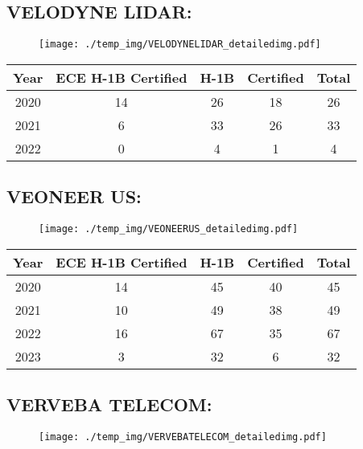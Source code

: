 \documentclass{article}%
\begin{document}
%
\newpage%
\subsection{VELODYNE LIDAR:}%
\label{subsec:VELODYNELIDAR}%
\label{VELODYNELIDARdetailed}%


\begin{figure}[htbp]%
\centering%
\texttt{[image: ./temp\_img/VELODYNELIDAR\_detailedimg.pdf]}%
\end{figure}

%
\begin{longtable}{c|c|c|c|c}%
\hline%
Year&ECE H{-}1B Certified&H{-}1B&Certified&Total\\%
\hline%
2020&14&26&18&26\\%
\hline%
2021&6&33&26&33\\%
\hline%
2022&0&4&1&4\\%
\hline%
\end{longtable}

%
\newpage%
\subsection{VEONEER US:}%
\label{subsec:VEONEERUS}%
\label{VEONEERUSdetailed}%


\begin{figure}[htbp]%
\centering%
\texttt{[image: ./temp\_img/VEONEERUS\_detailedimg.pdf]}%
\end{figure}

%
\begin{longtable}{c|c|c|c|c}%
\hline%
Year&ECE H{-}1B Certified&H{-}1B&Certified&Total\\%
\hline%
2020&14&45&40&45\\%
\hline%
2021&10&49&38&49\\%
\hline%
2022&16&67&35&67\\%
\hline%
2023&3&32&6&32\\%
\hline%
\end{longtable}

%
\newpage%
\subsection{VERVEBA TELECOM:}%
\label{subsec:VERVEBATELECOM}%
\label{VERVEBATELECOMdetailed}%


\begin{figure}[htbp]%
\centering%
\texttt{[image: ./temp\_img/VERVEBATELECOM\_detailedimg.pdf]}%
\end{figure}
\end{document}
